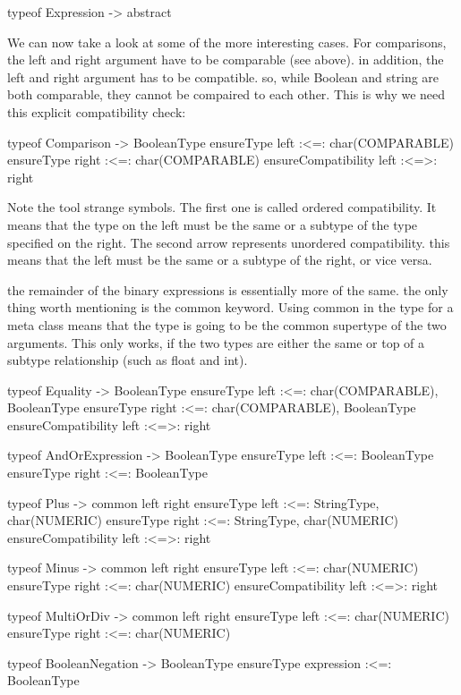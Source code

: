 \begin{code}
    typeof Expression -> abstract
\end{code}

We can now take a look at some of the more interesting cases. For comparisons,
the left and right argument  have to be comparable (see above). in addition, the
left and right argument has to be compatible. so, while Boolean and string are
both comparable,  they cannot be compaired to each other. This is why we need
this explicit compatibility check:

\begin{code}
 typeof Comparison -> BooleanType {
     ensureType left :<=: char(COMPARABLE)
     ensureType right :<=: char(COMPARABLE)
     ensureCompatibility left :<=>: right
 } 
\end{code}


Note the tool strange symbols. The first one is called ordered compatibility. It
means that the type on the left must be the same or a subtype of the type
specified on the right. The second arrow represents unordered compatibility.
this means that the left must be the same or a subtype of the right, or vice
versa. 

the remainder of the binary expressions is essentially more of the same. the
only thing worth mentioning is the common keyword. Using common in the type for
a meta class means that the type is going to be the common supertype of the two
arguments. This only works, if the two types are either the same or top of a
subtype relationship (such as float and int).


\begin{code}
typeof Equality -> BooleanType {
    ensureType left :<=: char(COMPARABLE), BooleanType
    ensureType right :<=: char(COMPARABLE), BooleanType
    ensureCompatibility left :<=>: right
}

typeof AndOrExpression -> BooleanType {
    ensureType left :<=: BooleanType
    ensureType right :<=: BooleanType 
}   

typeof Plus -> common left right {
    ensureType left :<=: StringType, char(NUMERIC)
    ensureType right :<=: StringType, char(NUMERIC)
    ensureCompatibility left :<=>: right
} 

typeof Minus -> common left right {
    ensureType left :<=: char(NUMERIC)
    ensureType right :<=: char(NUMERIC)
    ensureCompatibility left :<=>: right
} 

typeof MultiOrDiv -> common left right { 
    ensureType left :<=: char(NUMERIC)
    ensureType right :<=: char(NUMERIC)
} 

typeof BooleanNegation -> BooleanType {
    ensureType expression :<=: BooleanType
}
\end{code}


